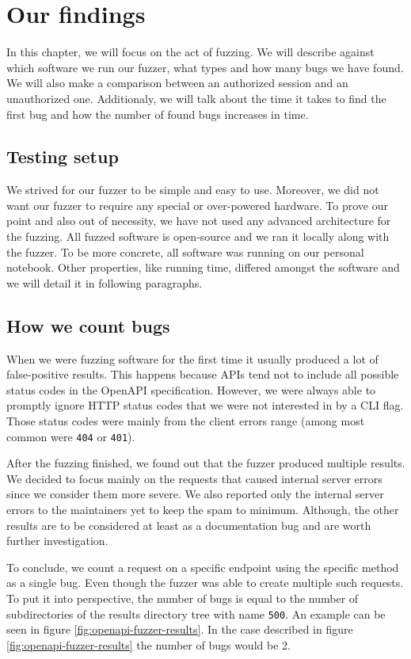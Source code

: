 \chapter{Our findings}
In this chapter, we will focus on the act of fuzzing. We will describe against which software we run our fuzzer, what types and how many bugs we have found. We will also make a comparison between an authorized session and an unauthorized one. Additionaly, we will talk about the time it takes to find the first bug and how the number of found bugs increases in time.

\section{Testing setup}
We strived for our fuzzer to be simple and easy to use. Moreover, we did not want our fuzzer to require any special or over-powered hardware. To prove our point and also out of necessity, we have not used any advanced architecture for the fuzzing. All fuzzed software is open-source and we ran it locally along with the fuzzer. To be more concrete, all software was running on our personal notebook. Other properties, like running time, differed amongst the software and we will detail it in following paragraphs.

\section{How we count bugs}
When we were fuzzing software for the first time it usually produced a lot of false-positive results. This happens because APIs tend not to include all possible status codes in the OpenAPI specification. However, we were always able to promptly ignore HTTP status codes that we were not interested in by a CLI flag. Those status codes were mainly from the client errors range (among most common were \texttt{404} or \texttt{401}).

After the fuzzing finished, we found out that the fuzzer produced multiple results. We decided to focus mainly on the requests that caused internal server errors since we consider them more severe. We also reported only the internal server errors to the maintainers yet to keep the spam to minimum. Although, the other results are to be considered at least as a documentation bug and are worth further investigation.

To conclude, we count a request on a specific endpoint using the specific method as a single bug. Even though the fuzzer was able to create multiple such requests. To put it into perspective, the number of bugs is equal to the number of subdirectories of the results directory tree with name \texttt{500}. An example can be seen in figure \ref{fig:openapi-fuzzer-results}. In the case described in figure \ref{fig:openapi-fuzzer-results} the number of bugs would be 2.

